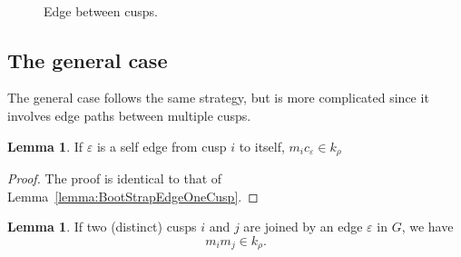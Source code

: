 \documentclass[12pt]{amsart}
\theoremstyle{definition}
\newtheorem{lemma}[theorem]{Lemma}
\numberwithin{equation}{section}
\begin{document}
\begin{figure}[htb]
\begin{center}
\hspace{-10mm}
\begin{minipage}[c]{0.3\textwidth}
\scalebox{0.8}{}
\end{minipage}
\hspace{2mm}
\begin{minipage}[c]{0.6\textwidth}
\scalebox{0.8}{}
\end{minipage}
\hfill
\\
\begin{minipage}[t]{0.32\textwidth}
\captionsetup{width=1\textwidth}
\caption{Self edge.}\label{fig:SelfEdgeCase}
\end{minipage}
\hspace{2mm}
\begin{minipage}[t]{0.64\textwidth}
\captionsetup{width=\textwidth}
\caption[Bla]{Edge between cusps.}\label{fig:TwoCuspCase}
\end{minipage}
\end{center}
\end{figure}

\subsection{The general case} \label{sec:ProofOfMainThm}The general case follows the same strategy, but is more complicated since it involves edge paths between multiple cusps. %

\begin{lemma}\label{lemma:BootStrapEdge}
If $\varepsilon$ is a self edge from cusp $i$ to itself, $m_ic_\varepsilon\in k_\rho$
\end{lemma}
\begin{proof}
The proof is identical to that of Lemma~\ref{lemma:BootStrapEdgeOneCusp}.
\end{proof}

\begin{lemma}\label{lemma:connectTwoCusp}
If two (distinct) cusps $i$ and $j$ are joined by an edge $\varepsilon$ in $G$, we have
\begin{equation}m_i m_j\in k_\rho.
\end{equation} 
\end{lemma}
\end{document}
